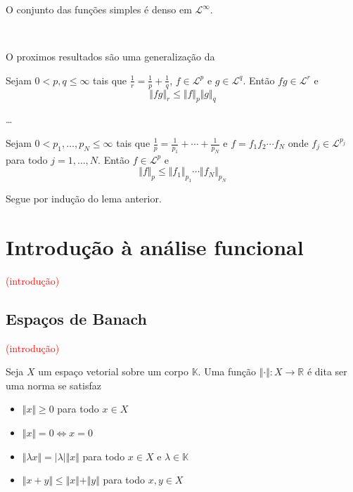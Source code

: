 \documentclass[a4paper, 11pt]{book}
\theoremstyle{definition}
\newcommand{\bR}{\mathbb{R}}
\newcommand{\bK}{\mathbb{K}}
\newcommand{\cL}{\mathcal{L}}
\begin{document}
\begin{tbox}
    O conjunto das funções simples é denso em $\cL^\infty$.
\end{tbox}
\begin{prf}
    ~
\end{prf}

O proximos resultados são uma generalização da 

\begin{lbox}
    Sejam $0 < p, q \leqslant \infty$ tais que $\frac{1}{r} = \frac{1}{p} + \frac{1}{q}$, $f \in \cL^p$ e $g \in \cL^q$.
    Então $fg \in \cL^r$ e
    \[
        \Vert fg \Vert_r \leqslant \Vert f \Vert_p \Vert g \Vert_q
    \]
\end{lbox}
\begin{prf}
    \dots
\end{prf}

\begin{pbox}
    Sejam $0 < p_1,\dots,p_N \leqslant \infty$ tais que $\frac{1}{p} = \frac{1}{p_1} + \cdots + \frac{1}{p_N}$ e $f = f_1 f_2 \cdots f_N$ onde $f_j \in \cL^{p_j}$ para todo $j = 1,\dots,N$. 
    Então $f \in \cL^p$ e 
    \[
        \Vert f \Vert_p \leqslant \Vert f_1 \Vert_{p_1} \cdots \Vert f_N \Vert_{p_N}
    \] 
\end{pbox}
\begin{prf}
    Segue por indução do lema anterior.
\end{prf}

\chapter{Introdução à análise funcional}

\textcolor{red}{(introdução)}

\section{Espaços de Banach}

\textcolor{red}{(introdução)}

\begin{dbox}
    Seja $X$ um espaço vetorial sobre um corpo $\bK$. Uma função $\Vert \cdot \Vert : X \to \bR$ é dita ser uma norma se satisfaz
    \begin{itemize}[leftmargin=*]
        \item $\Vert x \Vert \geqslant 0$ para todo $x \in X$
        \item $\Vert x \Vert = 0 \iff x = 0$
        \item $\Vert \lambda x \Vert = |\lambda| \Vert x \Vert$ para todo $x \in X$ e $\lambda \in \bK$
        \item $\Vert x + y \Vert \leqslant \Vert x \Vert + \Vert y \Vert$ para todo $x,y \in X$
    \end{itemize}
\end{dbox}
\end{document}

